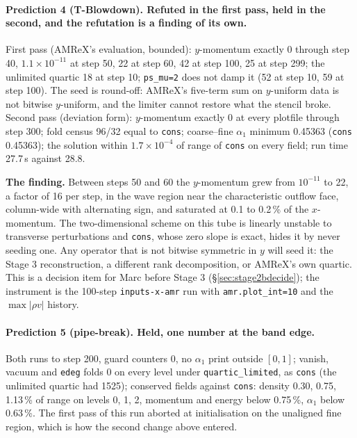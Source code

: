 \documentclass[11pt,a4paper]{article}
\newcommand{\code}[1]{\texttt{\small #1}}
\begin{document}
\paragraph{Prediction 4 (T-Blowdown).  Refuted in the first pass,
held in the second, and the refutation is a finding of its own.}
First pass (AMReX's evaluation, bounded): $y$-momentum exactly 0 through
step 40, $1.1\times10^{-11}$ at step 50, 22 at step 60, 42 at step 100,
25 at step 299; the unlimited quartic 18 at step 10; \code{ps\_mu=2}
does not damp it (52 at step 10, 59 at step 100).  The seed is round-off:
AMReX's five-term sum on $y$-uniform data is not bitwise $y$-uniform, and
the limiter cannot restore what the stencil broke.  Second pass (deviation
form): $y$-momentum exactly 0 at every plotfile through step 300; fold
census 96/32 equal to \code{cons}; coarse--fine $\alpha_1$ minimum
0.45363 (\code{cons} 0.45363); the solution within $1.7\times10^{-4}$ of
range of \code{cons} on every field; run time 27.7\,s against 28.8.

\textbf{The finding.}  Between steps 50 and 60 the $y$-momentum grew from
$10^{-11}$ to 22, a factor of 16 per step, in the wave region near the
characteristic outflow face, column-wide with alternating sign, and
saturated at 0.1 to 0.2\,\% of the $x$-momentum.  The two-dimensional
scheme on this tube is linearly unstable to transverse perturbations and
\code{cons}, whose zero slope is exact, hides it by never seeding one.
Any operator that is not bitwise symmetric in $y$ will seed it: the
Stage 3 reconstruction, a different rank decomposition, or AMReX's own
quartic.  This is a decision item for Marc before Stage 3
(\S\ref{sec:stage2bdecide}); the instrument is the 100-step
\code{inputs-x-amr} run with \code{amr.plot\_int=10} and the
$\max|\rho v|$ history.

\paragraph{Prediction 5 (pipe-break).  Held, one number at the band edge.}
Both runs to step 200, guard counters 0, no $\alpha_1$ print outside
$[0,1]$; vanish, vacuum and \code{edeg} folds 0 on every level under
\code{quartic\_limited}, as \code{cons} (the unlimited quartic had 1525);
conserved fields against \code{cons}: density 0.30, 0.75, 1.13\,\% of
range on levels 0, 1, 2, momentum and energy below 0.75\,\%, $\alpha_1$
below 0.63\,\%.  The first pass of this run aborted at initialisation on
the unaligned fine region, which is how the second change above entered.
\end{document}
